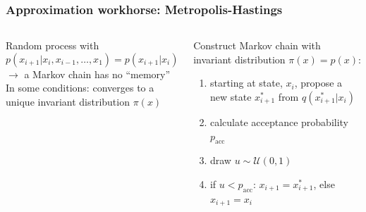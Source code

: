 \documentclass[t,aspectratio=169]{beamer}
\begin{document}
\begin{frame}
  \frametitle{Approximation workhorse: Metropolis-Hastings}
  \begin{columns}
  \begin{column}{0.48\textwidth}
  \begin{tcolorbox}[fontupper=\small, title=Markov chain]
    Random process with
    \begin{equation*}
      p(x_{i+1}|x_i, x_{i-1}, \ldots, x_1) = p(x_{i+1}|x_i)
    \end{equation*}
    $\rightarrow$ a Markov chain has no ``memory''\\
    
    In some conditions: converges to a unique invariant distribution $\pi(x)$
  \end{tcolorbox}  
\end{column}
\begin{column}{0.48\textwidth}  
  \begin{tcolorbox}[fontupper=\small, title=Metropolis-Hastings algorithm]
    Construct Markov chain with invariant distribution $\pi(x)=p(x)$:
    \begin{enumerate}
    \item starting at state, $x_i$, propose a new state $x_{i+1}^*$ from $q(x_{i+1}^*|x_i)$
    \item calculate acceptance probability $p_{\mathrm{acc}}$
    \item draw $u \sim \mathcal U(0,1)$
    \item if $u < p_{\mathrm{acc}}$: $x_{i+1} = x_{i+1}^*$, else $x_{i+1} = x_i$
    \end{enumerate}
  \end{tcolorbox}
\end{column}
\end{columns}
\end{frame}
\end{document}
